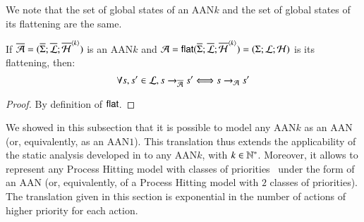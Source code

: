 We note that the set of global states of an AAN$k$
and the set of global states of its flattening are the same.

\begin{theorem}
\label{th:bisimPHP}
  If $\ov{\PH} = (\ov{\PHs}; \ov{\PHl}; \ov{\PHa}^{\angles{k}})$ is an AAN$k$
  and $\PH = \PHflat(\ov{\PHs}; \ov{\PHl}; \ov{\PHa}^{\angles{k}}) =
    (\PHs; \PHl; \PHa)$ is its flattening, then:
  \[ \forall s, s' \in \PHl, s \PHPtrans[\oPH] s' \Longleftrightarrow s \PHPtrans[\PH] s' \]
\end{theorem}

\begin{proof}
  By definition of $\PHflat$.
\end{proof}



We showed in this subsection that it is possible to model any AAN$k$
as an AAN (or, equivalently, as an AAN$1$).
This translation thus extends the applicability of the static analysis developed in
 to any AAN$k$, with $k \in \sN^*$.
Moreover, it allows to represent
any Process Hitting model with classes of priorities~\cite{FPMR13-CS2Bio}
under the form of an AAN
(or, equivalently, of a Process Hitting model with $2$ classes of priorities).
The translation given in this section
is exponential in the number of actions of higher priority for each action.
